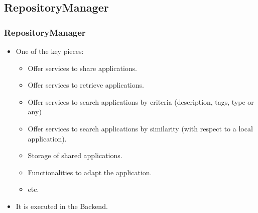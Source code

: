 \subsection{RepositoryManager}

\begin{frame}

	\frametitle{RepositoryManager} 
	
	\begin{itemize}
		\item One of the key pieces:
		
		\begin{itemize}
		        \item Offer services to share applications.
		        \item Offer services to retrieve applications.
		        \item Offer services to search applications by criteria (description,
		        tags, type or any)
		        \item Offer services to search applications by similarity (with
		        respect to a local application).
		        \item Storage of shared applications.
		        \item Functionalities to adapt the application.
		        \item etc.
	    \end{itemize} 
		
		\item It is executed in the Backend.

	\end{itemize}

\end{frame}


